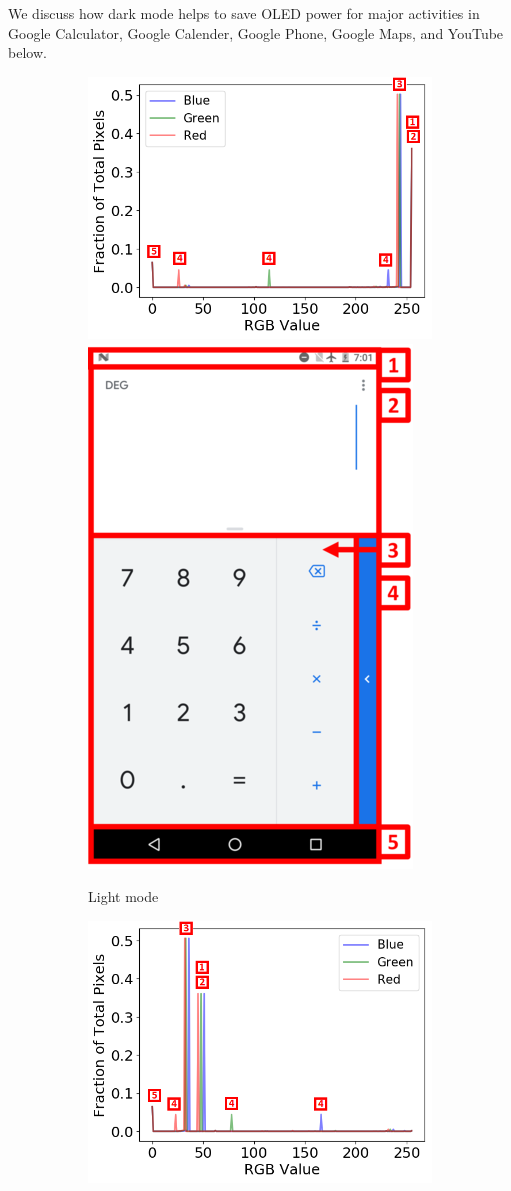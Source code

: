 We discuss how dark mode helps to save OLED power for major activities 
in Google Calculator, Google Calender, Google Phone, Google Maps, and YouTube below.

\begin{figure}[h]
	\begin{subfigure}[]{\columnwidth}
		\centering
		\includegraphics[width=0.58\columnwidth]{./figure/601a_calculator_light.png}\quad
		\includegraphics[width=0.27\columnwidth]{./figure/651a_calculator_light.png}
		\caption{Light mode}
	\end{subfigure}
	\begin{subfigure}[]{\columnwidth}
		\centering
		\includegraphics[width=0.58\columnwidth]{./figure/600a_calculator_dark.png}\quad

\end{subfigure}
\end{figure}
